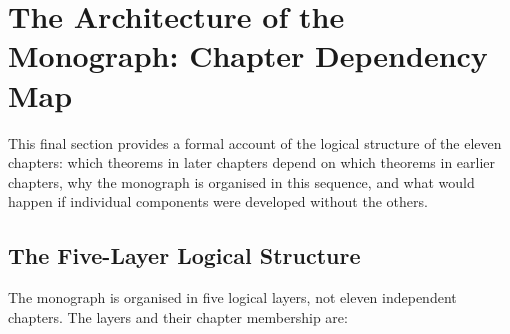 \section{The Architecture of the Monograph: Chapter Dependency Map}
\label{sec:ch11-dependency-map}

This final section provides a formal account of the logical structure of the
eleven chapters: which theorems in later chapters depend on which theorems in
earlier chapters, why the monograph is organised in this sequence, and what
would happen if individual components were developed without the others.

\subsection{The Five-Layer Logical Structure}
\label{subsec:ch11-five-layers}

The monograph is organised in five logical layers, not eleven independent
chapters.  The layers and their chapter membership are:

